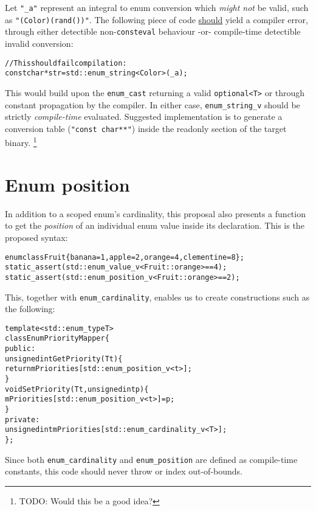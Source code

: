\documentclass[a4paper, 12pt]{article}
\begin{document}
\noindent
Let \texttt{"\_a"} represent an integral to enum conversion which
\textit{might not} be valid, such as \texttt{"(Color)(rand())"}. The following
piece of code \underline{should} yield a compiler error, through either
detectible non-\texttt{consteval} behaviour -or- compile-time detectible
invalid conversion:

\begin{alltt}\footnotesize
// This should fail compilation:
const char* str = std::enum\_string<Color>(\_a);
\end{alltt}

\noindent
This would build upon the \texttt{enum\_cast} returning a valid
\texttt{optional<T>} or through constant propagation by the compiler. In
either case, \texttt{enum\_string\_v} should be strictly \textit{compile-time}
evaluated. Suggested implementation is to generate a conversion table
(\texttt{"const char**"}) inside the readonly section of the target binary.
\footnote{TODO: Would this be a good idea?}


\section{Enum position}

In addition to a scoped enum's cardinality, this proposal also presents a
function to get the \textit{position} of an individual enum value inside
its declaration. This is the proposed syntax:

\begin{alltt}\footnotesize
enum class Fruit \{ banana = 1, apple = 2, orange = 4, clementine = 8 \};
static\_assert(std::enum\_value\_v<Fruit::orange> == 4);
static\_assert(std::enum\_position\_v<Fruit::orange> == 2);
\end{alltt}

\noindent
This, together with \texttt{enum\_cardinality}, enables us to create
constructions such as the following:

\begin{alltt}\footnotesize
template<std::enum\_type T>
class EnumPriorityMapper \{
public:
  unsigned int GetPriority(T t) \{
    return mPriorities[std::enum\_position\_v<t>];
  \}
  void SetPriority(T t, unsigned int p) \{
    mPriorities[std::enum\_position\_v<t>] = p;
  \}
private:
  unsigned int mPriorities[std::enum\_cardinality\_v<T>];
\};
\end{alltt}

\noindent
Since both \texttt{enum\_cardinality} and \texttt{enum\_position} are defined
as compile-time constants, this code should never throw or index out-of-bounds.
\end{document}
